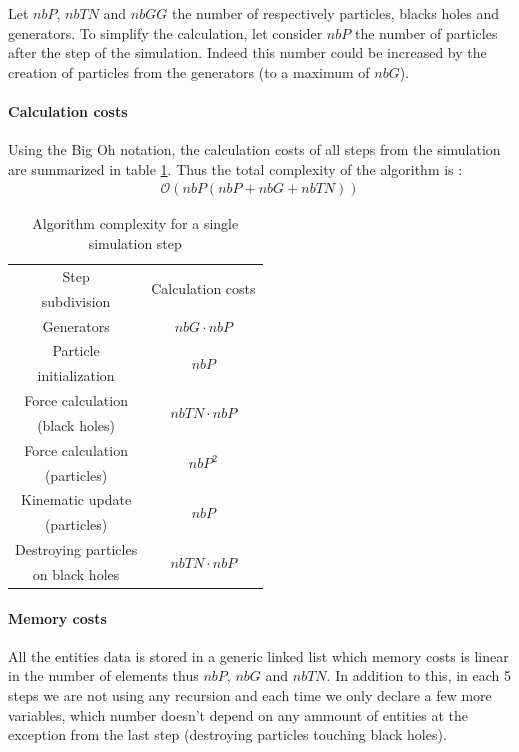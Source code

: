 \documentclass[a4paper]{article} %
\begin{document}
\begin{multicols*}{2}
Let $nbP$, $nbTN$ and $nbGG$ the number of respectively particles, blacks holes and generators.
To simplify the calculation, let consider $nbP$ the number of particles after the step of the simulation.
Indeed this number could be increased by the creation of particles from the generators (to a maximum of $nbG$).



\paragraph{Calculation costs}
Using the Big Oh notation, the calculation costs of all steps from the simulation
are summarized in table \ref{tab-calc}. Thus the total complexity of the algorithm is :
\begin{align}
\mathcal{O}(nbP (nbP + nbG + nbTN))
\end{align}


\begin{table}[H]
\begin{center}
\begin{tabular}{|c|c|}
\hline
Step & \multicolumn{1}{|c|}{\multirow{2}{*}{Calculation costs}} \\
subdivision   &  \\
\hline
\hline
Generators &  $nbG\cdot nbP$\\
\hline
Particle  &       \multicolumn{1}{|c|}{\multirow{2}{*}{$nbP$}}\\
initialization &  \\
\hline
Force calculation  & \multicolumn{1}{|c|}{\multirow{2}{*}{$nbTN\cdot nbP$}}\\
(black holes) &  \\
\hline
Force calculation  & \multicolumn{1}{|c|}{\multirow{2}{*}{$nbP^2$}}\\
(particles) &  \\
\hline
Kinematic update  & \multicolumn{1}{|c|}{\multirow{2}{*}{$nbP$}}\\
(particles) &  \\
\hline
Destroying particles &  \multicolumn{1}{|c|}{\multirow{2}{*}{$nbTN\cdot nbP$}}\\
 on black holes &  \\
\hline
\end{tabular}
\end{center}
\caption{Algorithm complexity for a single simulation step}
\label{tab-calc}
\end{table}

\paragraph{Memory costs} All the entities data is stored in a generic linked list
which memory costs is linear in the number of elements thus $nbP$, $nbG$ and $nbTN$.
In addition to this, in each 5 steps we are not using any recursion and each time we only
declare a few more variables, which number doesn't depend on any ammount of entities
at the exception from the last step (destroying particles touching black holes).


\end{multicols*}
\end{document}
